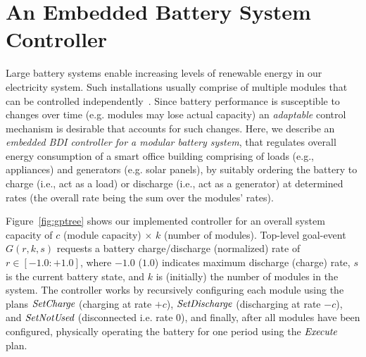 \section{An Embedded Battery System Controller}\label{sec:application}


Large battery systems enable increasing levels of renewable energy in our electricity system. 
%
Such installations usually comprise of multiple modules that can be controlled independently~\cite{norris02:grid}. 
Since battery performance is susceptible to changes over time (e.g. modules may lose actual capacity) an \emph{adaptable} control mechanism is desirable that accounts for such changes.
%
Here, we describe an {\em embedded BDI controller for a modular battery system}, that regulates overall energy consumption of a smart office building comprising of loads (e.g., appliances) and generators (e.g. solar panels), by suitably ordering the battery to charge (i.e., act as a load) or discharge (i.e., act as a generator) at determined rates (the overall rate being the sum over the modules' rates).

Figure~\ref{fig:gptree} shows our implemented controller for an overall system capacity of $c$ (module capacity) $\times$ $k$ (number of modules). Top-level goal-event $G(r,k,s)$ requests a battery charge/discharge (normalized) rate of $r \in [-1.0:+1.0]$, where $-1.0$ ($1.0$) indicates maximum discharge (charge) rate, $s$ is the current battery state, and $k$ is (initially) the number of modules in the system. 
The controller works by recursively configuring each module using the plans $\operatorname{\textit{SetCharge}}$ (charging at rate $+c$), $\operatorname{\textit{SetDischarge}}$ (discharging at rate $-c$), and $\operatorname{\textit{SetNotUsed}}$ (disconnected i.e. rate $0$), and finally, after all modules have been configured, physically operating the battery for one period using the $\operatorname{\textit{Execute}}$ plan. 

